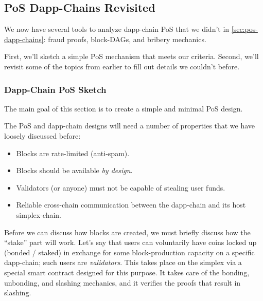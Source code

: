 \subsection{PoS Dapp-Chains Revisited}

\label{sec:pos-dapp-chain-design}


We now have several tools to analyze dapp-chain PoS that we didn't in \autoref{sec:pos-dapp-chains}: fraud proofs, block-DAGs, and bribery mechanics.

First, we'll sketch a simple PoS mechanism that meets our criteria.
Second, we'll revisit some of the topics from earlier to fill out details we couldn't before.

\subsubsection{Dapp-Chain PoS Sketch}

The main goal of this section is to create a simple and minimal PoS design.

The PoS and dapp-chain designs will need a number of properties that we have loosely discussed before:
\begin{itemize}
    \item Blocks are rate-limited (anti-spam).
    \item Blocks should be available \emph{by design}.
    \item Validators (or anyone) must not be capable of stealing user funds.
    \item Reliable cross-chain communication between the dapp-chain and its host simplex-chain.
\end{itemize}


Before we can discuss how blocks are created, we must briefly discuss how the ``stake'' part will work.
Let's say that users can voluntarily have coins locked up (bonded / staked) in exchange for some block-production capacity on a specific dapp-chain; such users are \emph{validators}.
This takes place on the simplex via a special smart contract designed for this purpose.
It takes care of the bonding, unbonding, and slashing mechanics, and it verifies the proofs that result in slashing.

